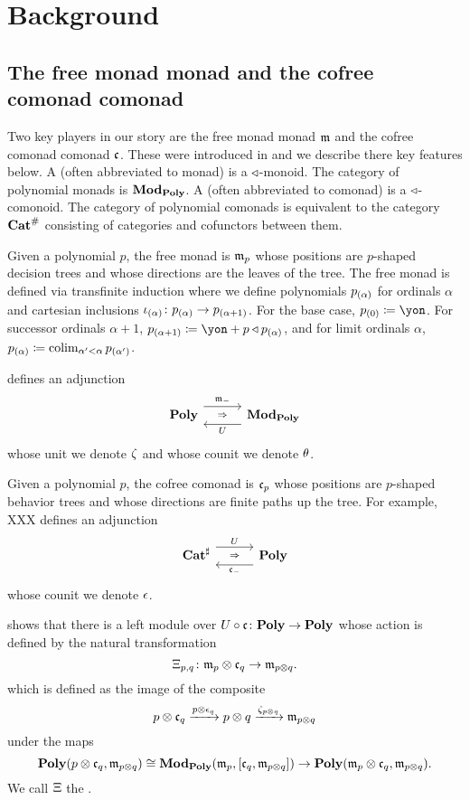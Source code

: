 \chapter{Background} \label{sec:background}



\section{The free monad monad and the cofree comonad comonad}

Two key players in our story are the free monad monad $\mathfrak{m}$ and the cofree comonad comonad $\mathfrak{c}$. These were introduced in \cite{libkind2024pattern} and we describe there key features below. A  (often abbreviated to monad) is a $\mathbin{\triangleleft}$-monoid. The category of polynomial monads is $\mathbf{Mod}_{\mathbf{Poly}}$. A  (often abbreviated to comonad) is a $\mathbin{\triangleleft}$-comonoid. The category of polynomial comonads is equivalent to the category $\mathbf{Cat}^\#$ consisting of categories and cofunctors between them.\cite{XXX}

Given a polynomial $p$, the free monad is $\mathfrak{m}_p$ whose positions are $p$-shaped decision trees and whose directions are the leaves of the tree. The free monad is defined via transfinite induction where we define polynomials $p_{(\alpha)}$ for ordinals $\alpha$ and cartesian inclusions $\iota_{(\alpha)}\colon p_{(\alpha)} \to p_{(\alpha +1)}$. For the base case, $p\hoc{0} \coloneqq \yon$. For successor ordinals $\alpha + 1$, $p\hoc{\alpha + 1} \coloneqq \yon + p \tri p\hoc{\alpha}$, and for limit ordinals $\alpha$, $p_{(\alpha)} \coloneqq \operatorname*{colim}_{\alpha' < \alpha} p _{(\alpha')}$. 


\cite[Theorem 2.10]{libkind2024pattern} defines an adjunction
\[
    \adj{\poly}{\free_-}{U}{\modpoly}
\]
whose unit we denote $\zeta$ and whose counit we denote $\theta$.

Given a polynomial $p$, the cofree comonad is $\mathfrak{c}_p$ whose positions are $p$-shaped behavior trees and whose directions are finite paths up the tree. For example, XXX %
\cite[Theorem 3.2]{libkind2024pattern} defines an adjunction 
\[
    \adj{\catsharp}{U}{\cofree_-}{\poly}
\]
whose counit we denote $\epsilon$.

\cite[Theorem 3.4]{libkind2024pattern} shows that there is a left module over $U \circ  \mathfrak{c} \colon \mathbf{Poly} \to \mathbf{Poly}$ whose action is defined by the natural transformation 
\[
    \Xi_{p,q}\colon \mathfrak{m}_p \otimes \mathfrak{c}_q \to \mathfrak{m}_{p \otimes q}.
\] which is defined as the image of the composite
\[
    p \otimes \mathfrak{c}_q \xrightarrow{p \otimes \epsilon_q} p \otimes q \xrightarrow{\zeta_{p \otimes q}} \mathfrak{m}_{p \otimes q}
\] under the maps
\[
    \mathbf{Poly}(p \otimes \mathfrak{c}_q, \mathfrak{m}_{p\otimes q})  \cong \mathbf{Mod}_{\mathbf{Poly}}(\mathfrak{m}_p, [\mathfrak{c}_q, \mathfrak{m}_{p\otimes q}]) \to \mathbf{Poly}(\mathfrak{m}_p \otimes \mathfrak{c}_q, \mathfrak{m}_{p \otimes q}).
\] We call $\Xi$ the .



